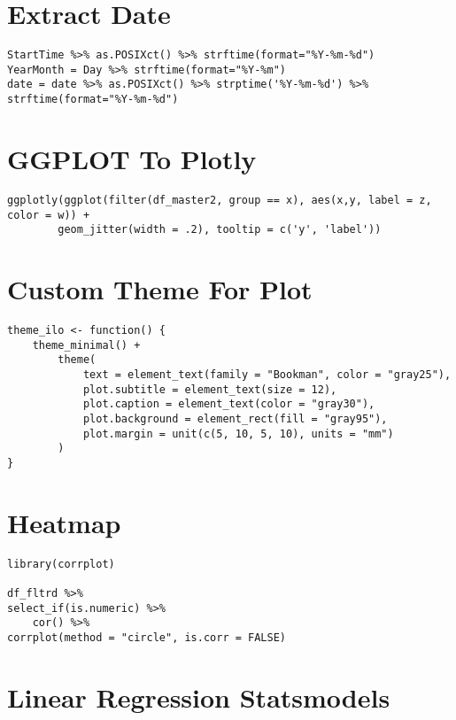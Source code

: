 \documentclass[]{book}
\begin{document}
\section{Extract Date}\label{extract-date}

\begin{verbatim}
StartTime %>% as.POSIXct() %>% strftime(format="%Y-%m-%d")
YearMonth = Day %>% strftime(format="%Y-%m")
date = date %>% as.POSIXct() %>% strptime('%Y-%m-%d') %>% strftime(format="%Y-%m-%d")
\end{verbatim}

\section{GGPLOT To Plotly}\label{ggplot-to-plotly}

\begin{verbatim}
ggplotly(ggplot(filter(df_master2, group == x), aes(x,y, label = z, color = w)) +
        geom_jitter(width = .2), tooltip = c('y', 'label'))
\end{verbatim}

\section{Custom Theme For Plot}\label{custom-theme-for-plot}

\begin{verbatim}
theme_ilo <- function() {
    theme_minimal() +
        theme(
            text = element_text(family = "Bookman", color = "gray25"),
            plot.subtitle = element_text(size = 12),
            plot.caption = element_text(color = "gray30"),
            plot.background = element_rect(fill = "gray95"),
            plot.margin = unit(c(5, 10, 5, 10), units = "mm")
        )
}
\end{verbatim}

\section{Heatmap}\label{heatmap}

\begin{verbatim}
library(corrplot)

df_fltrd %>% 
select_if(is.numeric) %>%
    cor() %>% 
corrplot(method = "circle", is.corr = FALSE)
\end{verbatim}

\section{Linear Regression
Statsmodels}\label{linear-regression-statsmodels}
\end{document}
